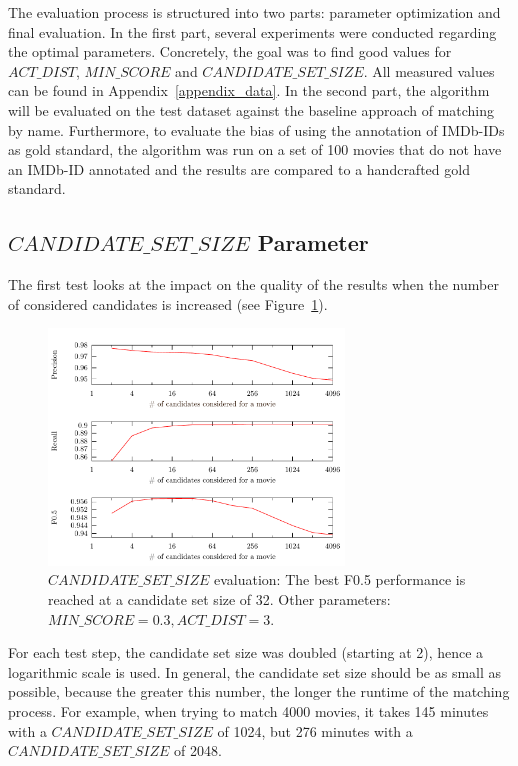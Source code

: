 The evaluation process is structured into two parts: parameter optimization and final evaluation.
In the first part, several experiments were conducted regarding the optimal parameters.
Concretely, the goal was to find good values for $ACT\_DIST$, $MIN\_SCORE$ and $CANDIDATE\_SET\_SIZE$.
All measured values can be found in Appendix~\ref{appendix_data}.
In the second part, the algorithm will be evaluated on the test dataset against the baseline approach of matching by name.
Furthermore, to evaluate the bias of using the annotation of IMDb-IDs as gold standard, the algorithm was run on a set of 100 movies that do not have an IMDb-ID annotated and the results are compared to a handcrafted gold standard.

\subsection{$CANDIDATE\_SET\_SIZE$ Parameter}
The first test looks at the impact on the quality of the results when the number of considered candidates is increased (see Figure~\ref{fig_candidate_set_size}).

\begin{figure}[h!]
  \begin{center}
  \includegraphics[width=0.7\textwidth]{images/candidateSetSize.pdf}
  \end{center}
  \caption{$CANDIDATE\_SET\_SIZE$ evaluation: The best F0.5 performance is reached at a candidate set size of 32. Other parameters: $MIN\_SCORE = 0.3, ACT\_DIST = 3$.}
  \label{fig_candidate_set_size}
\end{figure}

For each test step, the candidate set size was doubled (starting at 2), hence a logarithmic scale is used.
In general, the candidate set size should be as small as possible, because the greater this number, the longer the runtime of the matching process.
For example, when trying to match 4000 movies, it takes 145 minutes with a $CANDIDATE\_SET\_SIZE$ of 1024, but 276 minutes with a $CANDIDATE\_SET\_SIZE$ of 2048.

